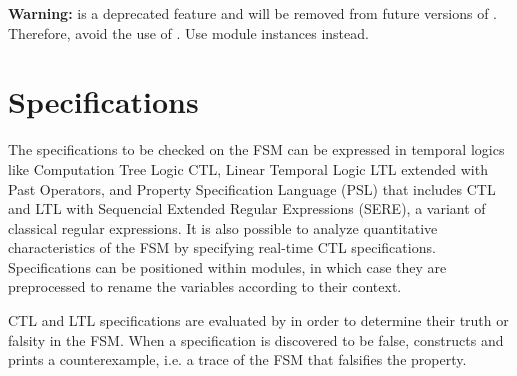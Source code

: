 \textbf{Warning:}  is a deprecated feature and will be
removed from future versions of \nusmv. Therefore, avoid the use of
. Use module instances instead.


\section{Specifications}
%
The specifications to be checked on the FSM can be expressed in
temporal logics like Computation Tree Logic CTL, Linear Temporal Logic
LTL extended with Past Operators, and Property Specification Language
(PSL) \cite{PSLLRM} that includes CTL and LTL with Sequencial Extended
Regular Expressions (SERE), a variant of classical regular expressions.
%
It is also possible to analyze quantitative characteristics of the FSM
by specifying real-time CTL specifications. 
%
Specifications can be positioned within modules, in which case they
are preprocessed to rename the variables according to their context.

CTL and LTL specifications are evaluated by \nusmv in order to
determine their truth or falsity in the FSM. 
%
When a specification is discovered to be false, \nusmv constructs and
prints a counterexample, i.e. a trace of the FSM that falsifies the
property.

